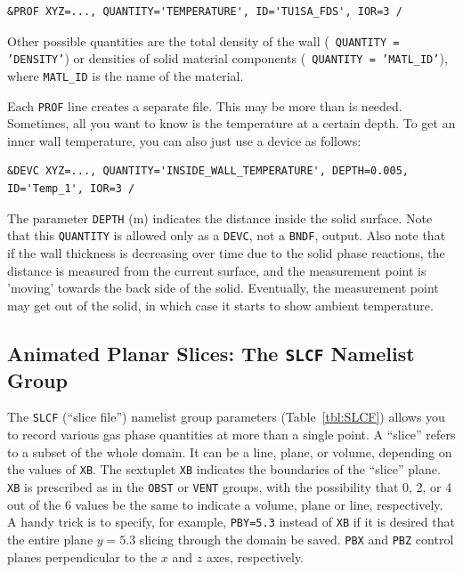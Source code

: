 \documentclass[11pt]{book}
\newcommand{\ct}{\tt\small}
\begin{document}
\footnotesize
\begin{verbatim}
&PROF XYZ=..., QUANTITY='TEMPERATURE', ID='TU1SA_FDS', IOR=3 /
\end{verbatim} \normalsize

\noindent
{}
Other possible quantities are the total density of the wall ({\ct
QUANTITY = 'DENSITY'}) or densities of solid material components ({\ct
QUANTITY = 'MATL\_ID'}), where {\ct MATL\_ID} is the name of the
material.

Each {\ct PROF} line creates a separate file. This may be more than is
needed. Sometimes, all you want to know is the temperature at a
certain depth. To get an inner wall temperature, you can also just use
a device as follows:

\footnotesize
\begin{verbatim}
&DEVC XYZ=..., QUANTITY='INSIDE_WALL_TEMPERATURE', DEPTH=0.005, ID='Temp_1', IOR=3 /
\end{verbatim} \normalsize

\noindent
The parameter {\ct DEPTH} (m) indicates the distance inside the solid surface.
Note that this {\ct QUANTITY} is allowed only as a {\ct DEVC}, not a
{\ct BNDF}, output. Also note that if the wall thickness is decreasing
over time due to the solid phase reactions, the distance is
measured from the current surface, and the measurement point is
'moving' towards the back side of the solid. Eventually, the
measurement point may get out of the solid, in which case it starts to
show ambient temperature.


\subsection{Animated Planar Slices: The \texorpdfstring{{\tt SLCF}}{SLCF} Namelist Group}%
\label{info:SLCF}

The {\ct SLCF} (``slice file'') namelist group parameters (Table~\ref{tbl:SLCF})
allows you to record various gas phase quantities
at more than a single point. A ``slice'' refers to a subset of the whole domain. It can be a line,
plane, or volume, depending on the values of {\ct XB}.
The sextuplet {\ct XB} indicates the boundaries of the ``slice'' plane.
{\ct XB} is prescribed as in the {\ct OBST} or {\ct VENT} groups, with
the possibility that 0, 2, or 4 out of the 6 values be the same to
indicate a volume, plane or line, respectively. A handy trick is to
specify, for example, {\ct PBY=5.3} instead of {\ct XB} if it is desired
that the entire plane $y=5.3$ slicing through the domain be saved.
{\ct PBX} and {\ct PBZ} control planes perpendicular to the
$x$ and $z$ axes, respectively.
\end{document}
